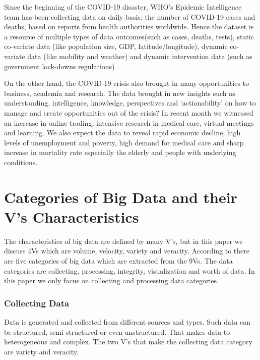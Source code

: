 \documentclass[12pt,letterpaper, twoside]{article}
\begin{document}
Since the beginning of the  COVID-19 disaster, WHO's Epidemic Intelligence team has been collecting data on daily basis; the number of COVID-19 cases and deaths, based on reports from health authorities worldwide. Hence the dataset is a resource of multiple types of data outcomes(such as cases, deaths, tests), static co-variate data (like population size, GDP, latitude/longitude), dynamic co-variate data (like mobility and weather) and dynamic intervention data (such as government lock-downs regulations) \cite{covid-19}. 

On the other hand, the COVID-19 crisis also brought in many opportunities to business, academia and research.  The data brought in  new insights such as understanding, intelligence, knowledge, perspectives and ‘actionability’ on how to manage and create opportunities out of the crisis? In recent month we witnessed an increase in online trading, intensive research in medical care, virtual meetings and learning.  We also expect the data to reveal rapid economic decline, high levels of unemployment and poverty, high demand for medical care and sharp increase in mortality rate especially the elderly and people with underlying conditions.

\section{Categories of Big Data and their V's Characteristics}
The characteristics of big data are defined by many V's, but in this paper we discuss 4Vs which are volume, velocity, variety and veracity. According to \cite{Owais} there are five categories of big data which are extracted from the 9Vs. The data categories are collecting, processing, integrity, visualization and worth of data.  In this paper we only focus on collecting and processing data categories. 

\subsubsection{Collecting Data}
Data is generated and collected from different sources and types.  Such data can be structured, semi-structured or even unstructured. That makes data to heterogeneous and complex. The two V's that make the collecting data category are variety and veracity. 
\end{document}
